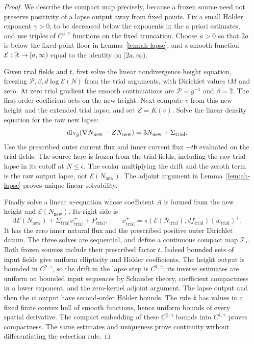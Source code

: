\begin{proof}
We describe the compact map precisely, because a frozen
source need not preserve positivity of a lapse output
away from fixed points.  Fix a small Hölder exponent
\(\gamma>0\), to be decreased below the exponents in
the a priori estimates, and use triples of
\(C^{1,\gamma}\) functions on the fixed truncation.
Choose \(a>0\) so that \(2a\) is below the fixed-point
floor in Lemma~\ref{lem:ah-lapse}, and a smooth function
\(\mathcal E:\mathbb R\to[a,\infty)\) equal to the identity
on \([2a,\infty)\).

Given trial fields and \(t\), first solve the linear
nondivergence height equation, freezing
\(\mathcal P,\beta,d\log\mathcal E(N)\) from the
trial arguments, with Dirichlet values \(tM\) and zero.
At zero trial gradient the smooth continuations are
\(\mathcal P=g^{-1}\) and \(\beta=2\).
The first-order coefficient acts on the new height.
Next compute \(v\) from this new height and the
extended trial lapse, and set \(Z=K(v)\).
Solve the linear density equation for the raw new lapse:
\[
 \operatorname{div}_g(\nabla N_{\mathrm{new}}-ZN_{\mathrm{new}})
    =3N_{\mathrm{new}}+\Sigma_{\mathrm{trial}} .
\]
Use the prescribed outer current flux and inner current
flux \(-t\mathfrak b\) evaluated on the trial fields.
The source here is frozen from the trial fields,
including the raw trial lapse in its cutoff at
\(N\le\epsilon\).  The scalar multiplying the drift
and the zeroth term is the raw output lapse, not
\(\mathcal E(N_{\mathrm{new}})\).
The adjoint argument in Lemma~\ref{lem:ah-lapse}
proves unique linear solvability.

Finally solve a linear \(w\)-equation whose coefficient
\(A\) is formed from the new height and
\(\mathcal E(N_{\mathrm{new}})\).  Its right side is
\[
 3\mathcal E(N_{\mathrm{new}})
    +\Sigma_{\mathrm{trial}}x_{\mathrm{trial}}^+
    +P_{\mathrm{trial}},
 \qquad
 x_{\mathrm{trial}}^+
  =s(\mathcal E(N_{\mathrm{trial}}),df_{\mathrm{trial}})
      (w_{\mathrm{trial}})^+ .
\]
It has the zero inner natural flux and the prescribed
positive outer Dirichlet datum.  The three solves are
sequential, and define a continuous compact map
\(\mathcal T_t\).
Both frozen sources include their prescribed factor \(t\).
Indeed bounded sets of input fields give uniform
ellipticity and Hölder coefficients.  The height output
is bounded in \(C^{2,\gamma}\), so the drift in the
lapse step is \(C^{1,\gamma}\); its inverse estimates
are uniform on bounded input sequences by Schauder
theory, coefficient compactness in a lower exponent,
and the zero-kernel adjoint argument.  The lapse output
and then the \(w\) output have second-order Hölder
bounds.  The rule \(\mathfrak b\) has values in a
fixed finite convex hull of smooth functions, hence
uniform bounds of every spatial derivative.  The
compact embedding of these \(C^{2,\gamma}\) bounds
into \(C^{1,\gamma}\) proves compactness.  The same estimates and
uniqueness prove continuity without differentiating
the selection rule.


\end{proof}
